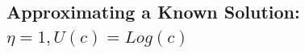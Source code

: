 \documentclass[12pt]{article}
\begin{document}
  
















\subsection{Approximating a Known Solution: $\eta=1, U(c) = Log(c)$ }
\label{sec:recov-known-solut}
\end{document}
